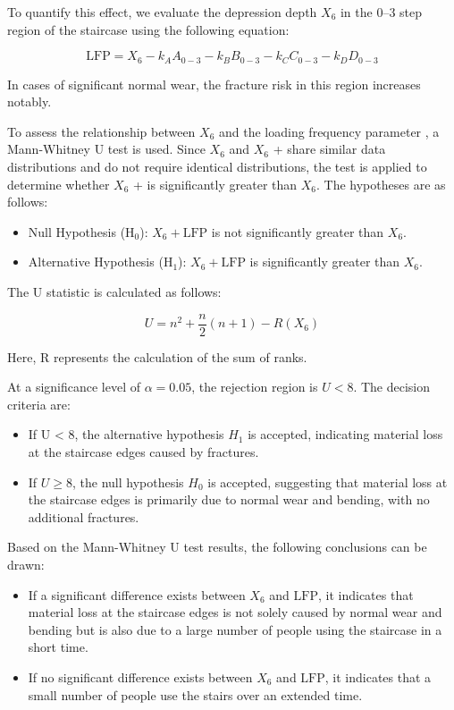 \documentclass{mcmthesis}
\begin{document}
To quantify this effect, we evaluate the depression depth $X_6$ in the 0–3 step region of the staircase using the following equation:


\[\text{LFP} = X_6 - k_A A_{0-3} - k_B B_{0-3} - k_C C_{0-3} - k_D D_{0-3}\]


In cases of significant normal wear, the fracture risk in this region increases notably. 

To assess the relationship between $X_6$ and the loading frequency parameter , a Mann-Whitney U test is used. Since $X_6$ and $X_6$ +  share similar data distributions and do not require identical distributions, the test is applied to determine whether $X_6$ +  is significantly greater than $X_6$. The hypotheses are as follows:


\begin{itemize} 
\item Null Hypothesis (H\(_0\)): \(X_6 + \text{LFP}\) is not significantly greater than \(X_6\). 
\item Alternative Hypothesis (H\(_1\)): \(X_6 + \text{LFP}\) is significantly greater than \(X_6\). 
\end{itemize}

The U statistic is calculated as follows:

$$U = n^2 + \frac{n}{2}(n + 1) - R(X_6)$$

Here, R represents the calculation of the sum of ranks.

At a significance level of \(\alpha = 0.05\), the rejection region is \(U < 8\). The decision criteria are:
\begin{itemize} 

\item If U < 8, the alternative hypothesis $H_1$ is accepted, indicating material loss at the staircase edges caused by fractures.

\item If \(U \geq 8\), the null hypothesis $H_0$ is accepted, suggesting that material loss at the staircase edges is primarily due to normal wear and bending, with no additional fractures.

\end{itemize}

Based on the Mann-Whitney U test results, the following conclusions can be drawn:


\begin{itemize} 
\item If a significant difference exists between \( X_6 \) and \( \text{LFP} \), it indicates that material loss at the staircase edges is not solely caused by normal wear and bending but is also due to a large number of people using the staircase in a short time. 
\item If no significant difference exists between \( X_6 \) and \( \text{LFP} \), it indicates that a small number of people use the stairs over an extended time. 
\end{itemize}
\end{document}
